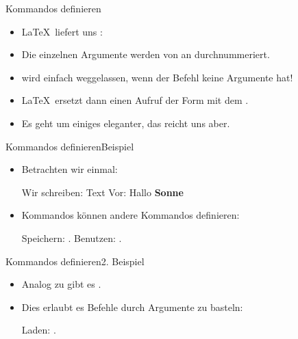 \begin{frame}[c,fragile]{Kommandos definieren}
\begin{itemize}[<+(1)->]
    \itemsep8pt
    \item \LaTeX\ liefert uns \bxlatex{\\newcommand}:\pause
{}
    \item Die einzelnen Argumente werden von  an durchnummeriert.
    \item {} wird einfach weggelassen, wenn der Befehl keine Argumente hat!
    \item \LaTeX\ ersetzt dann einen Aufruf der Form  mit dem .
    \item Es geht um einiges eleganter, das reicht uns aber.
\end{itemize}
\end{frame}

\begin{frame}[c,fragile]{Kommandos definieren\hfill Beispiel}
\begin{itemize}[<+(1)->]
    \item Betrachten wir einmal:\pause
\begin{sclatex}[morekeywords={[5]{\\hallo}}][]
\newcommand{\hallo}[2]
    {#2: Hallo \textbf{#1}}

Wir schreiben: \hallo{Sonne}{Text Vor}
\end{sclatex}
    \item Kommandos können andere Kommandos definieren:\pause
\begin{sclatex}[morekeywords={[5]{\\Meins,\\M}}][]
\newcommand{\M}[2]{\csgdef{M#1}{#2}}
Speichern: \M{eins}{1}.
Benutzen: \Meins.
\end{sclatex}
\end{itemize}
\end{frame}

\begin{frame}[c,fragile]{Kommandos definieren\hfill 2. Beispiel}
    \begin{itemize}[<+(1)->]
        \itemsep6pt
        \item Analog zu  gibt es .
        \item Dies erlaubt es Befehle durch Argumente zu basteln:\pause
\begin{sclatex}[morekeywords={[5]{\\StoreA,\\Load}}][]
\newcommand{\StoreA}{Super A}
\newcommand{\Load}[1]{\csuse{Store#1}}
Laden: \Load{A}.
\end{sclatex}
    \end{itemize}
\end{frame}

